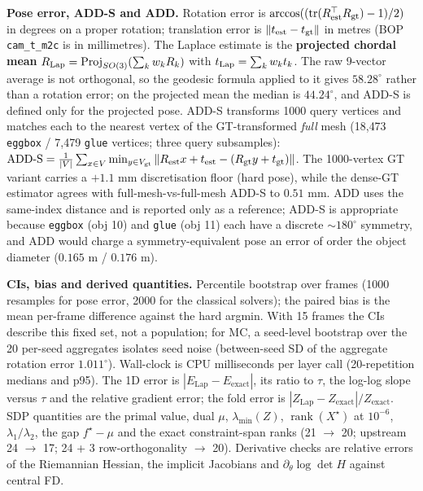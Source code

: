 \textbf{Pose error, ADD-S and ADD.} Rotation error is $\arccos((\operatorname{tr}(R_{\rm est}^\top R_{\rm gt})-1)/2)$ in degrees on a proper rotation; translation error is $\|t_{\rm est}-t_{\rm gt}\|$ in metres (BOP \texttt{cam\_t\_m2c} is in millimetres). The Laplace estimate is the \textbf{projected chordal mean} $R_{\rm Lap}=\mathrm{Proj}_{SO(3)}(\sum_kw_kR_k)$ with $t_{\rm Lap}=\sum_kw_kt_k$. The raw 9-vector average is not orthogonal, so the geodesic formula applied to it gives $58.28^\circ$ rather than a rotation error; on the projected mean the median is $44.24^\circ$, and ADD-S is defined only for the projected pose. ADD-S transforms 1000 query vertices and matches each to the nearest vertex of the GT-transformed \emph{full} mesh (18{,}473 \texttt{eggbox} / 7{,}479 \texttt{glue} vertices; three query subsamples): $\mathrm{ADD\text{-}S}=\frac{1}{|V|}\sum_{x\in V}\min_{y\in V_{\rm gt}}\|R_{\rm est}x+t_{\rm est}-(R_{\rm gt}y+t_{\rm gt})\|$. The 1000-vertex GT variant carries a $+1.1$ mm discretisation floor (hard pose), while the dense-GT estimator agrees with full-mesh-vs-full-mesh ADD-S to $0.51$ mm. ADD uses the same-index distance and is reported only as a reference; ADD-S is appropriate because \texttt{eggbox} (obj 10) and \texttt{glue} (obj 11) each have a discrete $\sim180^\circ$ symmetry, and ADD would charge a symmetry-equivalent pose an error of order the object diameter ($0.165$ m / $0.176$ m).

\textbf{CIs, bias and derived quantities.} Percentile bootstrap over frames (1000 resamples for pose error, 2000 for the classical solvers); the paired bias is the mean per-frame difference against the hard argmin. With 15 frames the CIs describe this fixed set, not a population; for MC, a seed-level bootstrap over the 20 per-seed aggregates isolates seed noise (between-seed SD of the aggregate rotation error $1.011^\circ$). Wall-clock is CPU milliseconds per layer call (20-repetition medians and p95). The 1D error is $|E_{\mathrm{Lap}}-E_{\mathrm{exact}}|$, its ratio to $\tau$, the log-log slope versus $\tau$ and the relative gradient error; the fold error is $|Z_{\mathrm{Lap}}-Z_{\mathrm{exact}}|/Z_{\mathrm{exact}}$. SDP quantities are the primal value, dual $\mu$, $\lambda_{\min}(Z)$, $\operatorname{rank}(X^\star)$ at $10^{-6}$, $\lambda_1/\lambda_2$, the gap $f^\star-\mu$ and the exact constraint-span ranks (21 $\to$ 20; upstream 24 $\to$ 17; 24 + 3 row-orthogonality $\to$ 20). Derivative checks are relative errors of the Riemannian Hessian, the implicit Jacobians and $\partial_\theta\log\det H$ against central FD.

